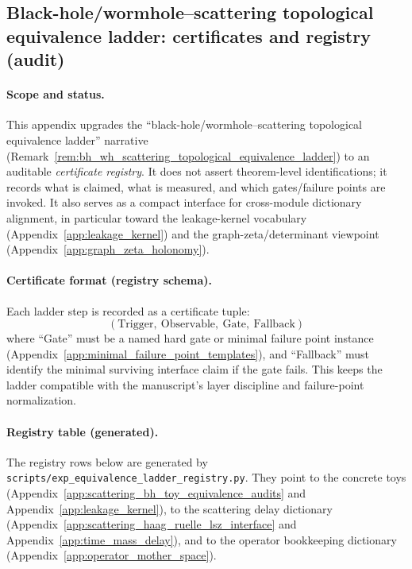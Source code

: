 \subsection{Black-hole/wormhole--scattering topological equivalence ladder: certificates and registry (audit)}
\label{app:equivalence_ladder_certificates}

\paragraph{Scope and status.}
\AuditTag This appendix upgrades the ``black-hole/wormhole--scattering topological equivalence ladder'' narrative (Remark~\ref{rem:bh_wh_scattering_topological_equivalence_ladder})
to an auditable \emph{certificate registry}.
It does not assert theorem-level identifications; it records what is claimed, what is measured, and which gates/failure points are invoked.
It also serves as a compact interface for cross-module dictionary alignment, in particular toward the leakage-kernel vocabulary (Appendix~\ref{app:leakage_kernel})
and the graph-zeta/determinant viewpoint (Appendix~\ref{app:graph_zeta_holonomy}).

\paragraph{Certificate format (registry schema).}
\AuditTag Each ladder step is recorded as a certificate tuple:
\[
(\mathrm{Trigger},\ \mathrm{Observable},\ \mathrm{Gate},\ \mathrm{Fallback})
\]
where ``Gate'' must be a named hard gate or minimal failure point instance (Appendix~\ref{app:minimal_failure_point_templates}),
and ``Fallback'' must identify the minimal surviving interface claim if the gate fails.
This keeps the ladder compatible with the manuscript's layer discipline and failure-point normalization.

\paragraph{Registry table (generated).}
\AuditTag The registry rows below are generated by \texttt{scripts/exp\_equivalence\_ladder\_registry.py}.
They point to the concrete toys (Appendix~\ref{app:scattering_bh_toy_equivalence_audits} and Appendix~\ref{app:leakage_kernel}),
to the scattering delay dictionary (Appendix~\ref{app:scattering_haag_ruelle_lsz_interface} and Appendix~\ref{app:time_mass_delay}),
and to the operator bookkeeping dictionary (Appendix~\ref{app:operator_mother_space}).


